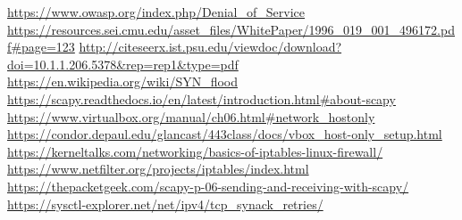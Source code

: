 \documentclass[11pt]{article}
\begin{document}
\url{https://www.owasp.org/index.php/Denial\_of\_Service}\break
\url{https://resources.sei.cmu.edu/asset\_files/WhitePaper/1996\_019\_001\_496172.pdf#page=123}\break
\url{http://citeseerx.ist.psu.edu/viewdoc/download?doi=10.1.1.206.5378&rep=rep1&type=pdf}\break
\url{https://en.wikipedia.org/wiki/SYN\_flood}\break
\url{https://scapy.readthedocs.io/en/latest/introduction.html#about-scapy}\break
\url{https://www.virtualbox.org/manual/ch06.html#network\_hostonly}\break
\url{https://condor.depaul.edu/glancast/443class/docs/vbox\_host-only\_setup.html}\break
\url{https://kerneltalks.com/networking/basics-of-iptables-linux-firewall/}\break
\url{https://www.netfilter.org/projects/iptables/index.html}\break
\url{https://thepacketgeek.com/scapy-p-06-sending-and-receiving-with-scapy/}\break
\url{https://sysctl-explorer.net/net/ipv4/tcp\_synack\_retries/}\break

\printindex
\end{document}

